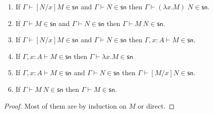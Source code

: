\documentclass{article}
\newcommand{\csn}{\mathsf{sn}}
\newcommand{\red}{\longrightarrow}
\begin{document}
\begin{lemma}\label{lem:psn}$\;$
  \begin{enumerate}
  \item\label{pp1} If $\Gamma \vdash   [N/x]M \in \csn$
                  and $\Gamma \vdash N \in \csn$ 
                 then $\Gamma \vdash (\lambda x.M) \;N \in \csn$.
  \item\label{pp2} If $\Gamma \vdash M \in \csn$ and $\Gamma \vdash N \in \csn$
    then $\Gamma \vdash M~N \in \csn$.
  \item If $\Gamma \vdash [N/x]M \in \csn$ and $\Gamma \vdash N \in
    \csn$ then $\Gamma, x{:}A \vdash M \in \csn$.
  \item If $\Gamma, x{:}A \vdash M \in \csn$ then $\Gamma \vdash
    \lambda x.M \in \csn$
  \item If $\Gamma, x{:}A \vdash M \in \csn$ and $\Gamma \vdash N \in
   \csn$ then $\Gamma \vdash [M/x]N \in \csn$.  
 \item If $\Gamma \vdash M~N \in \csn$ then $\Gamma \vdash M \in \csn$.
  \end{enumerate} 
\end{lemma}
\begin{proof}
Most of them are by induction on $M$ or direct. %
\end{proof}
\end{document}
